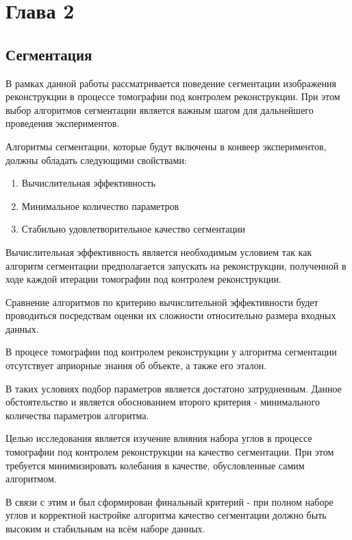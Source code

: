 \section{Глава 2}

\subsection{Сегментация}

В рамках данной работы рассматривается поведение сегментации изображения реконструкции в процессе томографии под контролем реконструкции. При этом выбор алгоритмов сегментации является важным шагом для дальнейшего проведения экспериментов.

Алгоритмы сегментации,  которые будут включены в конвеер экспериментов, должны обладать следующими свойствами:

\begin{enumerate}
    \item Вычислительная эффективность
    \item Минимальное количество параметров
    \item Стабильно удовлетворительное качество сегментации
\end{enumerate}

Вычислительная эффективность является необходимым условием так как алгоритм сегментации предполагается запускать на реконструкции, полученной в ходе каждой итерации томографии под контролем реконструкции.

Сравнение алгоритмов по критерию вычислительной эффективности будет проводиться посредствам оценки их сложности относительно размера входных данных.

В процесе томографии под контролем реконструкции у алгоритма сегментации отсутствует априорные знания об объекте, а также его эталон.

В таких условиях подбор параметров является достатоно затрудненным. Данное обстоятельство и является обоснованием второго критерия - минимального количества параметров алгоритма.

Целью исследования является изучение влияния набора углов в процессе томографии под контролем реконструкции на качество сегментации. При этом требуется минимизировать колебания в качестве, обусловленные самим алгоритмом. 

В связи с этим и был  сформирован финальный критерий - при полном наборе углов и корректной настройке алгоритма качество сегментации должно быть высоким и стабильным на всём наборе данных.

